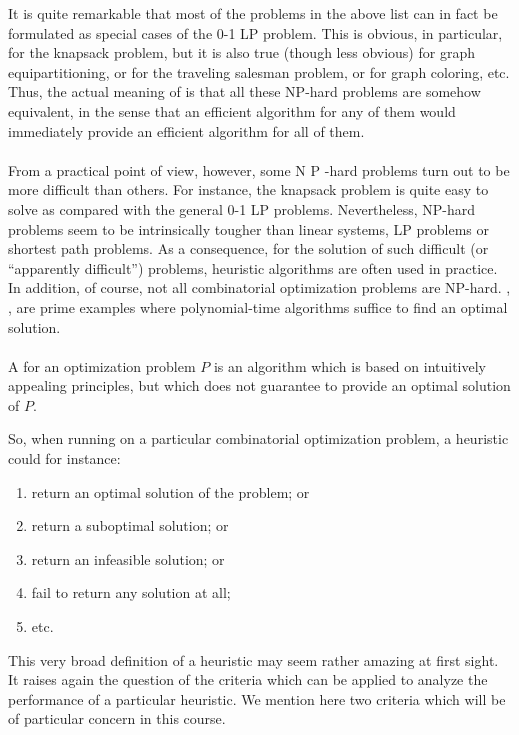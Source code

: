 It is quite remarkable that most of the problems in the above list can in fact be formulated as special cases of the 0-1 LP problem. This is obvious, in particular, for the knapsack problem, but it is also true (though less obvious) for graph equipartitioning, or for the traveling salesman problem, or for graph coloring, etc. Thus, the actual meaning of  is that all these NP-hard problems are somehow equivalent, in the sense that an efficient algorithm for any of them would immediately provide an efficient algorithm for all of them.

\paragraph{}
From a practical point of view, however, some N P -hard problems turn out to be more difficult than others. For instance, the knapsack problem is quite easy to solve as compared with the general 0-1 LP problems. Nevertheless, NP-hard problems seem to be intrinsically tougher than linear systems, LP problems or shortest path problems. As a consequence, for the solution of such difficult (or ``apparently difficult'') problems, heuristic algorithms are often used in practice. In addition, of course, not all combinatorial optimization problems are NP-hard. , ,  are prime examples where polynomial-time algorithms suffice to find an optimal solution.

\paragraph{}
\begin{definition}[Heuristic]
A  for an optimization problem $P$ is an algorithm which is based on intuitively appealing principles, but which does not guarantee to provide an optimal solution of $P$.
\end{definition}

So, when running on a particular combinatorial optimization problem, a heuristic could for instance:
\begin{enumerate}
 \item return an optimal solution of the problem; or
 \item return a suboptimal solution; or
 \item return an infeasible solution; or
 \item fail to return any solution at all;
 \item etc.
\end{enumerate}
This very broad definition of a heuristic may seem rather amazing at first sight. It raises again the question of the criteria which can be applied to analyze the performance of a particular heuristic. We mention here two criteria which will be of particular concern in this course.


